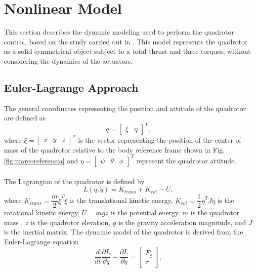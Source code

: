 \section{Nonlinear Model}
\label{sec:nonlinear}

This section describes the dynamic modeling used to perform the quadrotor control, based on the study carried out in \cite{modelamiento, modelamientoPDAFC, modelamientoNCQ}. This model represents the quadrotor as a solid symmetrical object subject to a total thrust and three torques, without considering the dynamics of the actuators.


\subsection{Euler-Lagrange Approach}
The general coordinates representing the position and attitude of the quadrotor are defined as
\begin{equation}
	q=\begin{bmatrix}
	\xi & \eta
	\end{bmatrix}^{T},
	\label{ec:coorgenerales}
\end{equation}
where $\xi=\begin{bmatrix}
x & y & z
\end{bmatrix}^{T}$ is the vector representing the position of the center of mass of the quadrotor relative to the body reference frame shown in Fig. \ref{fig:marcoreferencia} and $\eta=\begin{bmatrix}
\psi & \theta & \phi
\end{bmatrix}^{T}$ represent the quadrotor attitude.
\\\\
The Lagrangian of the quadrotor is defined by
\begin{equation}
	L(q,\dot{q})=K_{trans}+K_{rot} - U,	
	\label{ec:lagrangiano}
\end{equation}
where $ K_{trans} = \dfrac{m}{2}\dot{\xi}^{T}\dot{\xi} $ is the translational kinetic energy, $ K_{rot} = \dfrac{1}{2}\dot{\eta}^{T}J\dot{\eta} $ is the rotational kinetic energy, $ U=mgz $ is the potential energy, $m$ is the quadrotor mass , $z$ is the quadrotor elevation, $g$ is the gravity acceleration magnitude, and $J$ is the inertial matrix. The dynamic model of the quadrotor is derived from the Euler-Lagrange equation
\begin{equation}
	\dfrac{d}{dt}\dfrac{\partial L}{\partial \dot{q}}-\dfrac{\partial L}{\partial q}=
	\begin{bmatrix}
	F_{\xi}\\
	\tau
	\end{bmatrix},
	\label{ec:eulerlag}
 \end{equation} 
